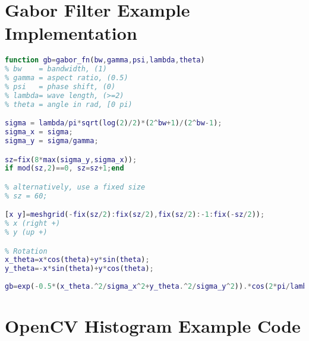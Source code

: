 \section{Gabor Filter Example Implementation}
\begin{lstlisting}[language=MATLAB,breaklines=true,
label=lst:gabor,
caption={Example implementation of a Gabor Filter in MATLAB\cite{Yang2010Gabor}}, frame=single]
function gb=gabor_fn(bw,gamma,psi,lambda,theta)
% bw    = bandwidth, (1)
% gamma = aspect ratio, (0.5)
% psi   = phase shift, (0)
% lambda= wave length, (>=2)
% theta = angle in rad, [0 pi)

sigma = lambda/pi*sqrt(log(2)/2)*(2^bw+1)/(2^bw-1);
sigma_x = sigma;
sigma_y = sigma/gamma;

sz=fix(8*max(sigma_y,sigma_x));
if mod(sz,2)==0, sz=sz+1;end

% alternatively, use a fixed size
% sz = 60;

[x y]=meshgrid(-fix(sz/2):fix(sz/2),fix(sz/2):-1:fix(-sz/2));
% x (right +)
% y (up +)

% Rotation 
x_theta=x*cos(theta)+y*sin(theta);
y_theta=-x*sin(theta)+y*cos(theta);
 
gb=exp(-0.5*(x_theta.^2/sigma_x^2+y_theta.^2/sigma_y^2)).*cos(2*pi/lambda*x_theta+psi);
\end{lstlisting}


\section{OpenCV Histogram Example Code}



